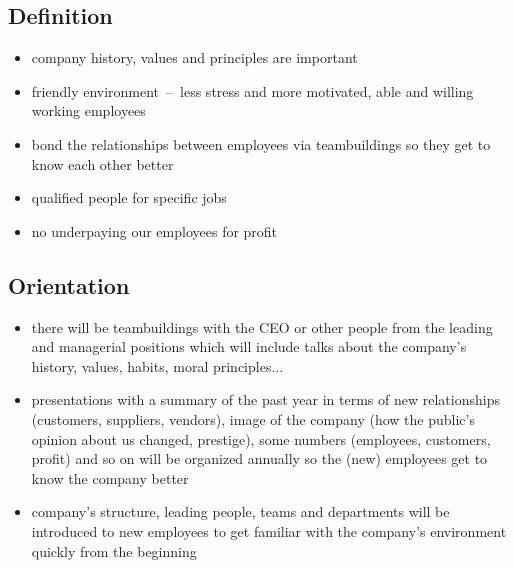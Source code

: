 \documentclass[11pt,a4paper]{article}
\begin{document}
    \subsection{Definition}
    \begin{itemize}
        \item company history, values and principles are important

        \item friendly environment~--~less stress and more motivated, able and willing working employees

        \item bond the relationships between employees via teambuildings so they get to know each other better

        \item qualified people for specific jobs

        \item no underpaying our employees for profit
    \end{itemize}

    \subsection{Orientation}
    \begin{itemize}
        \item there will be teambuildings with the CEO or other people from the leading and managerial positions which will include talks about the company’s history, values, habits, moral principles...

        \item presentations with a summary of the past year in terms of new relationships (customers, suppliers, vendors), image of the company (how the public’s opinion about us changed, prestige), some numbers (employees, customers, profit) and so on will be organized annually so the (new) employees get to know the company better

        \item company’s structure, leading people, teams and departments will be introduced to new employees to get familiar with the company’s environment quickly from the beginning
    \end{itemize}
\end{document}
